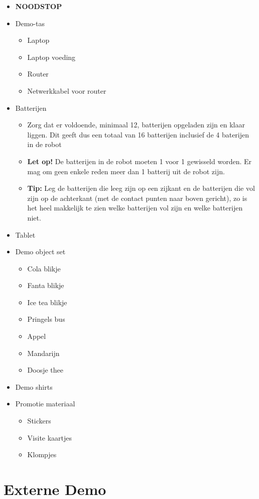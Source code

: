 \documentclass[a4paper,10pt]{article}
\numberwithin{equation}{section}
\numberwithin{figure}{section}
\numberwithin{table}{section}
\begin{document}
\begin{itemize}
	\item \textbf{NOODSTOP}
	\item Demo-tas
	\begin{itemize}
		\item Laptop
		\item Laptop voeding
		\item Router
		\item Netwerkkabel voor router
	\end{itemize}
	\item Batterijen
	\begin{itemize}
		\item Zorg dat er voldoende, minimaal 12, batterijen opgeladen zijn en klaar liggen. Dit geeft dus een totaal van 16 batterijen inclusief de 4 baterijen in de robot
		\item \textbf{Let op!} De batterijen in de robot moeten 1 voor 1 gewisseld worden. Er mag om geen enkele reden meer dan 1 batterij uit de robot zijn.
		\item \textbf{Tip:} Leg de batterijen die leeg zijn op een zijkant  en de batterijen die vol zijn op de achterkant (met de contact punten naar boven gericht), zo is het heel makkelijk te zien welke batterijen vol zijn en welke batterijen niet.
	\end{itemize}
	\item Tablet
	    \item Demo object set
	    \begin{itemize}
	    	\item Cola blikje
	    	\item Fanta blikje
	    	\item Ice tea blikje
	    	\item Pringels bus
	    	\item Appel
	    	\item Mandarijn
	    	\item Doosje thee
	    \end{itemize}
	\item Demo shirts
	\item Promotie materiaal
		\begin{itemize}
			\item Stickers
			\item Visite kaartjes
			\item Klompjes
		\end{itemize}
\end{itemize}

\section{Externe Demo}
\end{document}
